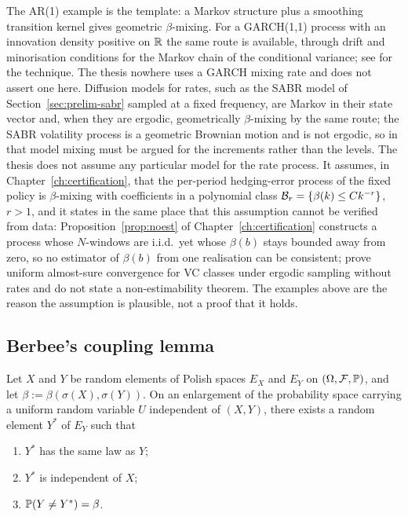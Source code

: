 \documentclass[../../../main.tex]{subfiles}
\begin{document}
\begin{remark}\label{rem:prelim-garch}
The AR(1) example is the template: a Markov structure plus a smoothing transition kernel gives geometric $\beta$-mixing. For a GARCH(1,1) process with an innovation density positive on $\mathbb{R}$ the same route is available, through drift and minorisation conditions for the Markov chain of the conditional variance; see \cite{doukhan1994} for the technique. The thesis nowhere uses a GARCH mixing rate and does not assert one here. Diffusion models for rates, such as the SABR model of Section~\ref{sec:prelim-sabr} sampled at a fixed frequency, are Markov in their state vector and, when they are ergodic, geometrically $\beta$-mixing by the same route; the SABR volatility process is a geometric Brownian motion and is not ergodic, so in that model mixing must be argued for the increments rather than the levels. The thesis does not assume any particular model for the rate process. It assumes, in Chapter~\ref{ch:certification}, that the per-period hedging-error process of the fixed policy is $\beta$-mixing with coefficients in a polynomial class $\mathcal B_{r}=\{\beta(k)\le Ck^{-r}\}$, $r>1$, and it states in the same place that this assumption cannot be verified from data: Proposition~\ref{prop:noest} of Chapter~\ref{ch:certification} constructs a process whose $N$-windows are i.i.d.\ yet whose $\beta(b)$ stays bounded away from zero, so no estimator of $\beta(b)$ from one realisation can be consistent; \cite{adams2010} prove uniform almost-sure convergence for VC classes under ergodic sampling without rates and do not state a non-estimability theorem. The examples above are the reason the assumption is plausible, not a proof that it holds.
\end{remark}

\subsection{Berbee's coupling lemma}

\begin{lemma}\label{lem:prelim-berbee}
Let $X$ and $Y$ be random elements of Polish spaces $E_X$ and $E_Y$ on $(\Omega,\mathcal F,\mathbb{P})$, and let $\beta:=\beta(\sigma(X),\sigma(Y))$. On an enlargement of the probability space carrying a uniform random variable $U$ independent of $(X,Y)$, there exists a random element $Y^*$ of $E_Y$ such that
\begin{enumerate}[nosep,label=(\roman*)]
\item $Y^*$ has the same law as $Y$;
\item $Y^*$ is independent of $X$;
\item $\mathbb{P}(Y\ne Y^*)=\beta$.
\end{enumerate}
\end{lemma}
\end{document}
